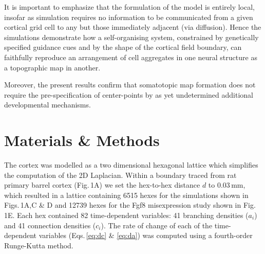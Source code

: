\documentclass[9pt,lineno]{elife}
\begin{document}
It is important to emphasize that the formulation of the model is entirely
local, insofar as simulation requires no information to be communicated from a
given cortical grid cell to any but those immediately adjacent (via
diffusion). Hence the simulations demonstrate how a self-organising system,
constrained by genetically specified guidance cues and by the shape of the
cortical field boundary, can faithfully reproduce an arrangement of cell
aggregates in one neural structure as a topographic map in another.

Moreover, the present results confirm that somatotopic map formation does not
require the pre-specification of center-points by as yet undetermined
additional developmental mechanisms.

\section{Materials \& Methods}

%
%

The cortex was modelled as a two dimensional hexagonal lattice which
simplifies the computation of the 2D Laplacian. Within a boundary traced from
rat primary barrel cortex (Fig.\,1A) we set the hex-to-hex distance
$d$ to 0.03\,mm, which resulted in a lattice containing 6515 hexes for the
simulations shown in Figs.\,1A,C \& D and 12739 hexes for the Fgf8
misexpression study shown in Fig.\,1E. Each hex contained 82 time-dependent
variables: 41 branching densities ($a_i$) and 41 connection densities ($c_i$).
The rate of change of each of the time-dependent variables (Eqs.\,\ref{eq:dc}
\& \ref{eq:da}) was computed using a fourth-order Runge-Kutta method.
\end{document}
